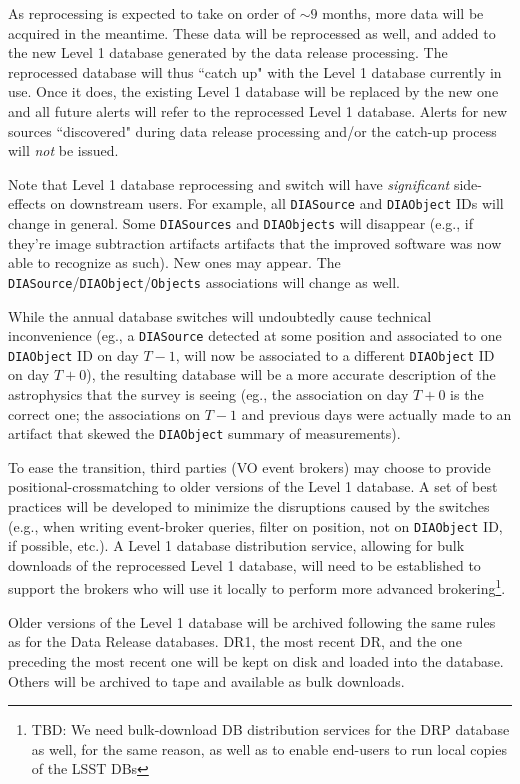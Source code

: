 \documentclass[12pt]{article}
\newcommand{\code}[1]{\texttt{#1}}
\newcommand{\DIASource}{\code{DIASource}\xspace}
\newcommand{\DIASources}{\code{DIASources}\xspace}
\newcommand{\DIAObject}{\code{DIAObject}\xspace}
\newcommand{\DIAObjects}{\code{DIAObjects}\xspace}
\newcommand{\DB}{{Level 1 database}\xspace}
\newcommand{\DR}{{Data Release database}\xspace}
\newcommand{\Objects}{\code{Objects}\xspace}
\begin{document}
As reprocessing is expected to take on order of $\sim 9$ months, more data will be acquired in the meantime. These data will be reprocessed as well, and added to the new \DB generated by the data release processing. The reprocessed database will thus ``catch up" with the \DB currently in use. Once it does, the existing \DB will be replaced by the new one and all future alerts will refer to the reprocessed \DB. Alerts for new sources ``discovered" during data release processing and/or the catch-up process will {\em not} be issued.

Note that \DB reprocessing and switch will have {\em significant} side-effects on downstream users. For example, all \DIASource and \DIAObject IDs will change in general. Some \DIASources and \DIAObjects will disappear (e.g., if they're image subtraction artifacts artifacts that the improved software was now able to recognize as such). New ones may appear. The \DIASource/\DIAObject/\Objects associations will change as well.

While the annual database switches will undoubtedly cause technical inconvenience (eg., a \DIASource detected at some position and associated to one \DIAObject ID on day $T-1$, will now be associated to a different \DIAObject ID on day $T+0$), the resulting database will be a more accurate description of the astrophysics that the survey is seeing (eg., the association on day $T+0$ is the correct one; the associations on $T-1$ and previous days were actually made to an artifact that skewed the \DIAObject summary of measurements).

To ease the transition, third parties (VO event brokers) may choose to provide positional-crossmatching to older versions of the \DB. A set of best practices will be developed to minimize the disruptions caused by the switches (e.g., when writing event-broker queries, filter on position, not on \DIAObject ID, if possible, etc.). A \DB distribution service, allowing for bulk downloads of the reprocessed \DB, will need to be established to support the brokers who will use it locally to perform more advanced brokering\footnote{TBD: We need bulk-download DB distribution services for the DRP database as well, for the same reason, as well as to enable end-users to run local copies of the LSST DBs}.

Older versions of the \DB will be archived following the same rules as for the \DR{}s. DR1, the most recent DR, and the one preceding the most recent one will be kept on disk and loaded into the database. Others will be archived to tape and available as bulk downloads.
\end{document}
